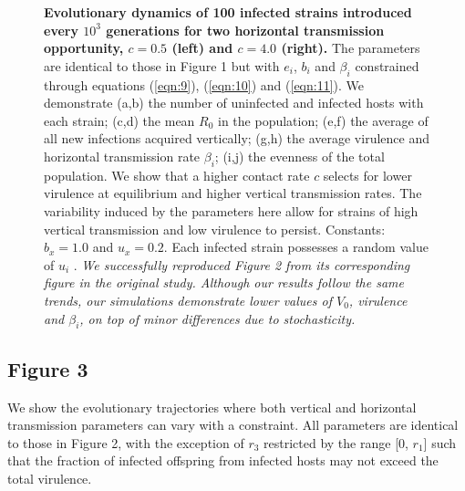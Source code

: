 \begin{figure}[tbp]
    \medskip
    \hfil
\caption{\textbf{Evolutionary dynamics of 100 infected strains introduced every
$10^3$ generations for two horizontal transmission opportunity, $c = 0.5$ (left)
and $c = 4.0$ (right).} The parameters are identical to those in Figure 1 but
with $e_i$, $b_i$ and $\beta_i$ constrained through equations (\ref{eqn:9}),
(\ref{eqn:10}) and (\ref{eqn:11}). We demonstrate (a,b) the number of uninfected
and infected hosts with each strain; (c,d) the mean $R_0$ in the population;
(e,f) the average of all new infections acquired vertically; (g,h) the average
virulence and horizontal transmission rate $\beta_i$; (i,j) the evenness of the
total population. We show that a higher contact rate $c$ selects for lower
virulence at equilibrium and higher vertical transmission rates. The variability
induced by the parameters here allow for strains of high vertical transmission
and low virulence to persist. Constants: $b_x = 1.0$ and $u_x = 0.2$. Each
infected strain possesses a random value of $u_i$ \in [$u_x$, 1].
\textit{We successfully reproduced Figure 2 from its corresponding figure in the
original study. Although our results follow the same trends, our simulations
demonstrate lower values of $V_0$, virulence and $\beta_i$, on top of minor
differences due to stochasticity.}
}
\label{fig:figure2}
\end{figure}

\subsection{Figure 3}

We show the evolutionary trajectories where both vertical and horizontal
transmission parameters can vary with a constraint. All parameters are identical
to those in Figure 2, with the exception of $r_3$ restricted by the range
[0, $r_1$] such that the fraction of infected offspring from infected hosts
may not exceed the total virulence.

